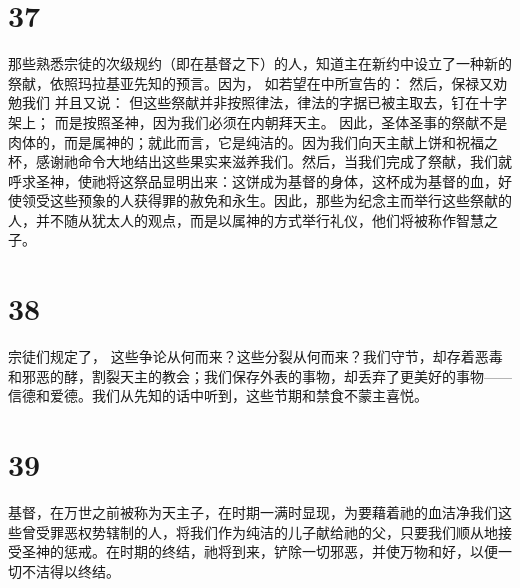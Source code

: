 
\section{37}

那些熟悉宗徒的次级规约（即在基督之下）的人，知道主在新约中设立了一种新的祭献，依照玛拉基亚先知的预言。因为， 如若望在中所宣告的： 然后，保禄又劝勉我们 并且又说： 但这些祭献并非按照律法，律法的字据已被主取去，钉在十字架上； 而是按照圣神，因为我们必须在内朝拜天主。 因此，圣体圣事的祭献不是肉体的，而是属神的；就此而言，它是纯洁的。因为我们向天主献上饼和祝福之杯，感谢祂命令大地结出这些果实来滋养我们。然后，当我们完成了祭献，我们就呼求圣神，使祂将这祭品显明出来：这饼成为基督的身体，这杯成为基督的血，好使领受这些预象的人获得罪的赦免和永生。因此，那些为纪念主而举行这些祭献的人，并不随从犹太人的观点，而是以属神的方式举行礼仪，他们将被称作智慧之子。\par


\section{38}

宗徒们规定了， 这些争论从何而来？这些分裂从何而来？我们守节，却存着恶毒和邪恶的酵，割裂天主的教会；我们保存外表的事物，却丢弃了更美好的事物——信德和爱德。我们从先知的话中听到，这些节期和禁食不蒙主喜悦。\par


\section{39}

基督，在万世之前被称为天主子，在时期一满时显现，为要藉着祂的血洁净我们这些曾受罪恶权势辖制的人，将我们作为纯洁的儿子献给祂的父，只要我们顺从地接受圣神的惩戒。在时期的终结，祂将到来，铲除一切邪恶，并使万物和好，以便一切不洁得以终结。\par

